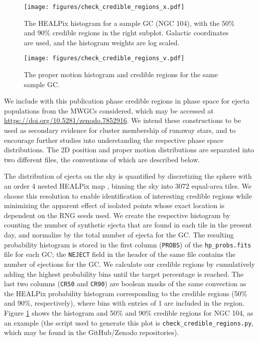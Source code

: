 \documentclass[twocolumn]{aastex631}
\begin{document}
\begin{figure}
    \centering
    \texttt{[image: figures/check\_credible\_regions\_x.pdf]}
    \caption{
        The HEALPix histogram for a sample GC (NGC 104), with the 50\% and 90\% credible regions in the right subplot.
        Galactic coordinates are used, and the histogram weights are log scaled.
    }
    \label{fig:check_credible_regions_x}
\end{figure}

\begin{figure}
    \centering
    \texttt{[image: figures/check\_credible\_regions\_v.pdf]}
    \caption{
        The proper motion histogram and credible regions for the same sample GC.
    }
    \label{fig:check_credible_regions_v}
\end{figure}

We include with this publication phase credible regions in phase space for ejecta populations from the MWGCs considered, which may be accessed at \url{https://doi.org/10.5281/zenodo.7852916}.
We intend these constructions to be used as secondary evidence for cluster membership of runaway stars, and to encourage further studies into understanding the respective phase space distributions.
The 2D position and proper motion distributions are separated into two different files, the conventions of which are described below.

The distribution of ejecta on the sky is quantified by discretizing the sphere with an order 4 nested HEALPix map \citep{2005ApJ...622..759G}, binning the sky into 3072 equal-area tiles.
We choose this resolution to enable identification of interesting credible regions while minimizing the apparent effect of isolated points whose exact location is dependent on the RNG seeds used.
We create the respective histogram by counting the number of synthetic ejecta that are found in each tile in the present day, and normalize by the total number of ejecta for the GC.
The resulting probability histogram is stored in the first column (\texttt{PROBS}) of the \texttt{hp\_probs.fits} file for each GC; the \texttt{NEJECT} field in the header of the same file contains the number of ejections for the GC.
We calculate our credible regions by cumulatively adding the highest probability bins until the target percentage is reached.
The last two columns (\texttt{CR50} and \texttt{CR90}) are boolean masks of the same convection as the HEALPix probability histogram corresponding to the credible regions (50\% and 90\%, respectively), where bins with entries of 1 are included in the region.
Figure \ref{fig:check_credible_regions_x} shows the histogram and 50\% and 90\% credible regions for NGC 104, as an example (the script used to generate this plot is \texttt{check\_credible\_regions.py}, which may be found in the GitHub/Zenodo repositories).
\end{document}
